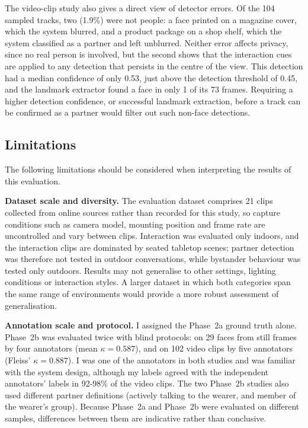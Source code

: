 The video-clip study also gives a direct view of detector errors. Of the 104
sampled tracks, two (1.9\%) were not people: a face printed on a magazine cover,
which the system blurred, and a product package on a shop shelf, which the system
classified as a partner and left unblurred. Neither error affects privacy, since no
real person is involved, but the second shows that the interaction cues are applied
to any detection that persists in the centre of the view. This detection had a
median confidence of only 0.53, just above the detection threshold of 0.45, and the
landmark extractor found a face in only 1 of its 73 frames. Requiring a higher
detection confidence, or successful landmark extraction, before a track can be
confirmed as a partner would filter out such non-face detections.

\subsection{Limitations}
\label{sec:disc_limitations}

The following limitations should be considered when interpreting the results of this
evaluation.

\textbf{Dataset scale and diversity.} The evaluation dataset comprises 21 clips
collected from online sources rather than recorded for this study, so capture
conditions such as camera model, mounting position and frame rate are uncontrolled
and vary between clips. Interaction was evaluated only indoors, and the interaction
clips are dominated by seated tabletop scenes; partner detection was therefore not
tested in outdoor conversations, while bystander behaviour was tested only outdoors.
Results may not generalise to other settings, lighting conditions or interaction
styles. A larger dataset in which both categories span the same range of
environments would provide a more robust assessment of generalisation.

\textbf{Annotation scale and protocol.} I assigned the Phase~2a ground truth
alone. Phase~2b was evaluated twice with blind protocols: on 29 faces from still
frames by four annotators (mean $\kappa = 0.587$), and on 102 video clips by five
annotators (Fleiss' $\kappa = 0.887$). I was one of the annotators in both studies
and was familiar with the system design, although my labels agreed with the
independent annotators' labels in 92-98\% of the video clips. The two Phase~2b
studies also used different partner definitions (actively talking to the wearer,
and member of the wearer's group). Because Phase~2a and Phase~2b were evaluated on
different samples, differences between them are indicative rather than conclusive.

